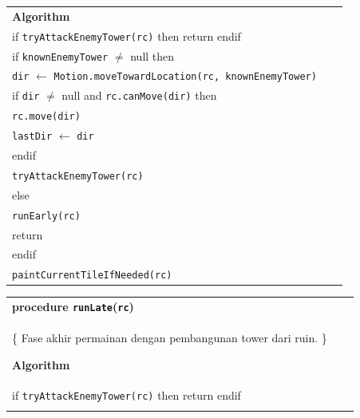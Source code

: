 \documentclass{article}
\newenvironment{pseudobox}
{
\centering
\begin{longtable}{|p{0.94\linewidth}|}
\hline
}
{
\\ \hline
\end{longtable}
\vspace{0.05cm}
}
\begin{document}
\begin{enumerate}[label=\alph*.]
\begin{pseudobox}
\textbf{Algorithm} \\

\hspace*{1.5em}if \texttt{tryAttackEnemyTower(rc)} then return endif \\

\hspace*{1.5em}if \texttt{knownEnemyTower} $\neq$ null then \\

\hspace*{3em}\texttt{dir} $\leftarrow$ \texttt{Motion.moveTowardLocation(rc, knownEnemyTower)} \\

\hspace*{3em}if \texttt{dir} $\neq$ null and \texttt{rc.canMove(dir)} then \\
\hspace*{4.5em}\texttt{rc.move(dir)} \\
\hspace*{4.5em}\texttt{lastDir} $\leftarrow$ \texttt{dir} \\
\hspace*{3em}endif \\

\hspace*{3em}\texttt{tryAttackEnemyTower(rc)} \\

\hspace*{1.5em}else \\
\hspace*{3em}\texttt{runEarly(rc)} \\
\hspace*{3em}return \\
\hspace*{1.5em}endif \\

\hspace*{1.5em}\texttt{paintCurrentTileIfNeeded(rc)}

\end{pseudobox}
\begin{pseudobox}
\textbf{procedure \texttt{runLate}(\texttt{rc})} \\
\{ Fase akhir permainan dengan pembangunan tower dari ruin. \}

\textbf{Algorithm} \\

\hspace*{1.5em}if \texttt{tryAttackEnemyTower(rc)} then return endif \\


\end{pseudobox}
\end{enumerate}
\end{document}
